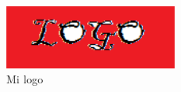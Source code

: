 \begin{figure}[htb!] %
\centering %
\includegraphics[width=0.5\textwidth]{logo} %
\caption{Mi logo}
\label{fig:logo} %
\end{figure}

